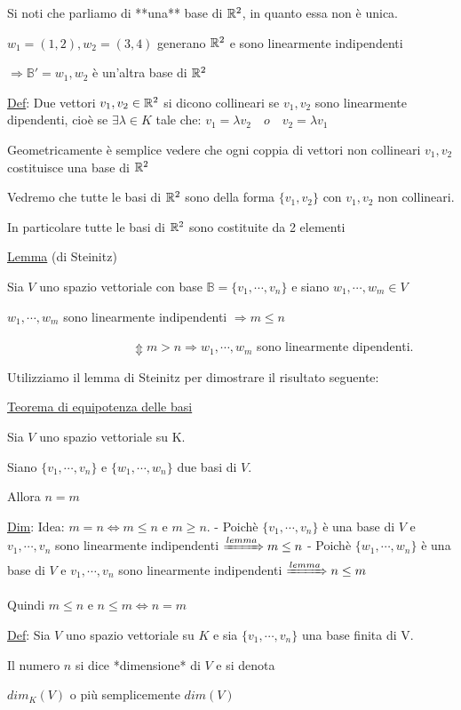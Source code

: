 \documentclass{article}
\begin{document}
  Si noti che parliamo di **una** base di $\mathbb{R}^2$, in quanto essa non è unica.

  $w_1=(1,2),w_2=(3,4)$ generano $\mathbb{R}^2$ e sono linearmente indipendenti

  $\Rightarrow\mathbb{B}'={w_1,w_2}$ è un'altra base di $\mathbb{R}^2$

\ul{Def}: Due vettori $v_1,v_2\in\mathbb{R}^2$ si dicono collineari se $v_1,v_2$ sono linearmente dipendenti, cioè se $\exists\lambda\in K$ tale che:
$v_1=\lambda v_2\quad o\quad v_2=\lambda v_1$

Geometricamente è semplice vedere che ogni coppia di vettori non collineari $v_1,v_2$ costituisce una base di $\mathbb{R}^2$

Vedremo che tutte le basi di $\mathbb{R}^2$ sono della forma $\{v_1,v_2\}$ con $v_1,v_2$ non collineari.

In particolare tutte le basi di $\mathbb{R}^2$ sono costituite da 2 elementi

\ul{Lemma} (di Steinitz)

Sia $V$ uno spazio vettoriale con base $\mathbb{B}=\{v_1,\cdots,v_n\}$ e siano $w_1,\cdots,w_m\in V$

$w_1,\cdots,w_m$ sono linearmente indipendenti $\Rightarrow m\le n$

$\qquad\qquad\qquad\qquad\qquad\Updownarrow m>n\Rightarrow w_1,\cdots,w_m$ sono linearmente dipendenti.

Utilizziamo il lemma di Steinitz per dimostrare il risultato seguente:

\ul{Teorema di equipotenza delle basi}

Sia $V$ uno spazio vettoriale su K.

Siano $\{v_1,\cdots,v_n\}$ e $\{w_1,\cdots,w_n\}$ due basi di $V$.

Allora $n=m$

\ul{Dim}: Idea: $m=n\Leftrightarrow m\le n$ e $m\ge n$.
- Poichè $\{v_1,\cdots,v_n\}$ è una base di $V$ e $v_1,\cdots,v_n$ sono linearmente indipendenti $\xRightarrow{lemma}m\le n$
- Poichè $\{w_1,\cdots,w_n\}$ è una base di $V$ e $v_1,\cdots,v_n$ sono linearmente indipendenti $\xRightarrow{lemma}n\le m$

  Quindi $m\le n$ e $n\le m\Leftrightarrow n=m$

\ul{Def}: Sia $V$ uno spazio vettoriale su $K$ e sia $\{v_1,\cdots,v_n\}$ una base finita di V.

Il numero $n$ si dice *dimensione* di $V$ e si denota

$dim_K(V)$ o più semplicemente $dim(V)$
\end{document}
